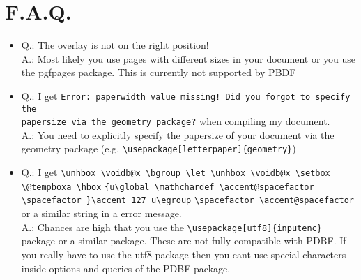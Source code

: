 \documentclass[11pt]{article}
\begin{document}
\section{F.A.Q.}
\begin{itemize}
\item Q.: The overlay is not on the right position!\\
A.: Most likely you use pages with different sizes in your document or you use the pgfpages package. This is currently not supported by PBDF 
\item Q.: I get \verb|Error: paperwidth value missing! Did you forgot to specify the| \\ \verb|papersize via the geometry package?| when compiling my document.\\
A.: You need to explicitly specify the papersize of your document via the geometry package (e.g. \verb|\usepackage[letterpaper]{geometry}|)
\item Q.: I get \verb|\unhbox \voidb@x \bgroup \let \unhbox \voidb@x \setbox \@tempboxa \hbox| \verb|{u\global \mathchardef \accent@spacefactor \spacefactor }\accent 127 u\egroup| \newline \verb|\spacefactor \accent@spacefactor| or a similar string in a error message.\\
A.: Chances are high that you use the \verb|\usepackage[utf8]{inputenc}| package or a similar package. These are not fully compatible with PDBF. If you really have to use the utf8 package then you cant use special characters inside options and queries of the PDBF package.
\end{itemize}
\end{document}

